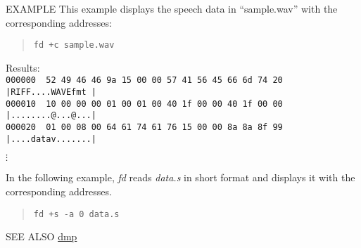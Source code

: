\begin{qsection}{EXAMPLE}
 This example displays the speech data in ``sample.wav'' with
 the corresponding addresses:
\begin{quote}
 \verb!fd +c sample.wav!
\end{quote}
 Results:\\
\verb!000000  52 49 46 46 9a 15 00 00 57 41 56 45 66 6d 74 20 |RIFF....WAVEfmt |!\\
\verb!000010  10 00 00 00 01 00 01 00 40 1f 00 00 40 1f 00 00 |........@...@...|!\\
\verb!000020  01 00 08 00 64 61 74 61 76 15 00 00 8a 8a 8f 99 |....datav.......|!
\begin{center}
 $\vdots$\\
\end{center}

 In the following example, {\em fd} reads {\em data.s} in short format and
 displays it with the corresponding addresses.
\begin{quote}
 \verb!fd +s -a 0 data.s!
\end{quote}
\end{qsection}

\begin{qsection}{SEE ALSO}
\hyperlink{dmp}{dmp}
\end{qsection}
